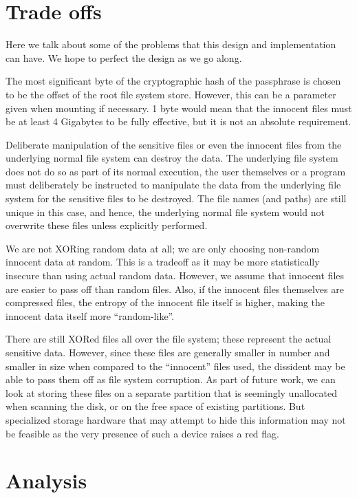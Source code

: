 \documentclass[10pt,onecolumn]{article}
\begin{document}
\section{Trade offs}

Here we talk about some of the problems that this design and implementation can have. We hope to perfect the design as we go along. 

The most significant byte of the cryptographic hash of the passphrase is chosen to be the offset of the root file system store. However, this can be a parameter given when mounting if necessary. 1 byte would mean that the innocent files must be at least 4 Gigabytes to be fully effective, but it is not an absolute requirement. 

Deliberate manipulation of the sensitive files or even the innocent files from the underlying normal file system can destroy the data. The underlying file system does not do so as part of its normal execution, the user themselves or a program must deliberately be instructed to manipulate the data from the underlying file system for the sensitive files to be destroyed. The file names (and paths) are still unique in this case, and hence, the underlying normal file system would not overwrite these files unless explicitly performed. 

We are not XORing random data at all; we are only choosing non-random innocent data at random. This is a tradeoff as it may be more statistically insecure than using actual random data. However, we assume that innocent files are easier to pass off than random files. Also, if the innocent files themselves are compressed files, the entropy of the innocent file itself is higher, making the innocent data itself more ``random-like''. 

There are still XORed files all over the file system; these represent the actual sensitive data. However, since these files are generally smaller in number and smaller in size when compared to the ``innocent'' files used, the dissident may be able to pass them off as file system corruption. As part of future work, we can look at storing these files on a separate partition that is seemingly unallocated when scanning the disk, or on the free space of existing partitions. But specialized storage hardware that may attempt to hide this information may not be feasible as the very presence of such a device raises a red flag. 

\section{Analysis}
\end{document}

